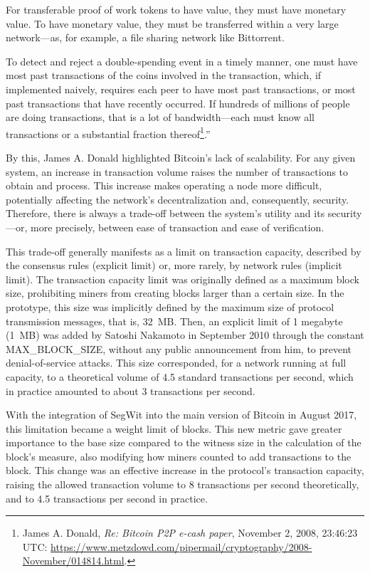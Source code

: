 \documentclass[
  a5paper,
  smalldemyvopaper,10pt,twoside,onecolumn,openright,extrafontsizes,hidelinks]{memoir}
\begin{document}
For transferable proof of work tokens to have value, they must have
monetary value. To have monetary value, they must be transferred within
a very large network---as, for example, a file sharing network like
Bittorrent.

To detect and reject a double-spending event in a timely manner, one
must have most past transactions of the coins involved in the
transaction, which, if implemented naively, requires each peer to have
most past transactions, or most past transactions that have recently
occurred. If hundreds of millions of people are doing transactions, that
is a lot of bandwidth---each must know all transactions or a substantial
fraction thereof\footnote{James A. Donald, \emph{Re: Bitcoin P2P e-cash
  paper}, November 2, 2008, 23:46:23 UTC:
  \url{https://www.metzdowd.com/pipermail/cryptography/2008-November/014814.html}.}.''

By this, James A. Donald highlighted Bitcoin's lack of scalability. For
any given system, an increase in transaction volume raises the number of
transactions to obtain and process. This increase makes operating a node
more difficult, potentially affecting the network's decentralization
and, consequently, security. Therefore, there is always a trade-off
between the system's utility and its security---or, more precisely,
between ease of transaction and ease of verification.

This trade-off generally manifests as a limit on transaction capacity,
described by the consensus rules (explicit limit) or, more rarely, by
network rules (implicit limit). The transaction capacity limit was
originally defined as a maximum block size, prohibiting miners from
creating blocks larger than a certain size. In the prototype, this size
was implicitly defined by the maximum size of protocol transmission
messages, that is, 32~MB. Then, an explicit limit of 1 megabyte (1~MB)
was added by Satoshi Nakamoto in September 2010 through the constant
MAX\_BLOCK\_SIZE, without any public announcement from him, to prevent
denial-of-service attacks. This size corresponded, for a network running
at full capacity, to a theoretical volume of 4.5 standard transactions
per second, which in practice amounted to about 3 transactions per
second.

With the integration of SegWit into the main version of Bitcoin in
August 2017, this limitation became a weight limit of blocks. This new
metric gave greater importance to the base size compared to the witness
size in the calculation of the block's measure, also modifying how
miners counted to add transactions to the block. This change was an
effective increase in the protocol's transaction capacity, raising the
allowed transaction volume to 8 transactions per second theoretically,
and to 4.5 transactions per second in practice.
\end{document}
